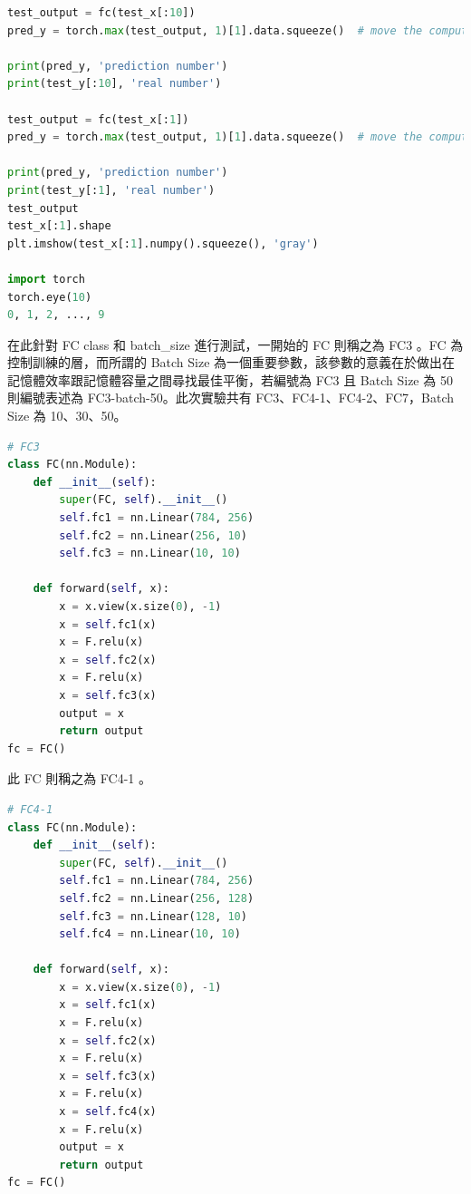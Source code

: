 \documentclass[11pt,UTF8]{ctexart}
\begin{document}
\begin{lstlisting}[language={python}]
test_output = fc(test_x[:10])
pred_y = torch.max(test_output, 1)[1].data.squeeze()  # move the computation in GPU

print(pred_y, 'prediction number')
print(test_y[:10], 'real number')

test_output = fc(test_x[:1])
pred_y = torch.max(test_output, 1)[1].data.squeeze()  # move the computation in GPU

print(pred_y, 'prediction number')
print(test_y[:1], 'real number')
test_output
test_x[:1].shape
plt.imshow(test_x[:1].numpy().squeeze(), 'gray')

import torch
torch.eye(10)
0, 1, 2, ..., 9
	\end{lstlisting}


在此針對 FC class 和 batch\_size 進行測試，一開始的 FC 則稱之為 FC3 。FC 為控制訓練的層，而所謂的 Batch Size 為一個重要參數，該參數的意義在於做出在記憶體效率跟記憶體容量之間尋找最佳平衡，若編號為 FC3 且 Batch Size 為 50 則編號表述為 FC3-batch-50。此次實驗共有 FC3、FC4-1、FC4-2、FC7，Batch Size 為 10、30、50。


	\begin{lstlisting}[language={python}]
# FC3
class FC(nn.Module):
    def __init__(self):
        super(FC, self).__init__()
        self.fc1 = nn.Linear(784, 256)
        self.fc2 = nn.Linear(256, 10)
        self.fc3 = nn.Linear(10, 10)

    def forward(self, x):
        x = x.view(x.size(0), -1)
        x = self.fc1(x)
        x = F.relu(x)
        x = self.fc2(x)
        x = F.relu(x)
        x = self.fc3(x)
        output = x
        return output
fc = FC()
	\end{lstlisting}

此 FC 則稱之為 FC4-1 。

	\begin{lstlisting}[language={python}]
# FC4-1
class FC(nn.Module):
    def __init__(self):
        super(FC, self).__init__()
        self.fc1 = nn.Linear(784, 256)
        self.fc2 = nn.Linear(256, 128)
        self.fc3 = nn.Linear(128, 10)
        self.fc4 = nn.Linear(10, 10)

    def forward(self, x):
        x = x.view(x.size(0), -1)
        x = self.fc1(x)
        x = F.relu(x)
        x = self.fc2(x)
        x = F.relu(x)
        x = self.fc3(x)
        x = F.relu(x)
        x = self.fc4(x)
        x = F.relu(x)
        output = x
        return output
fc = FC()
	\end{lstlisting}
\end{document}
